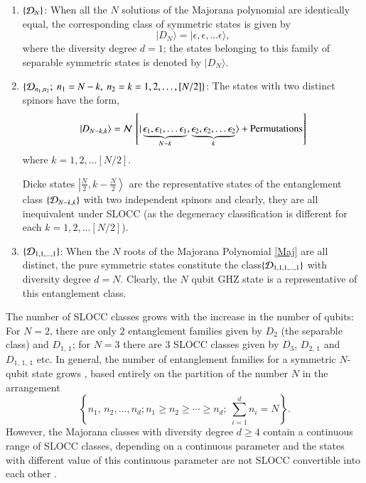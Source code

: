 \begin{enumerate}
\item $\{{\cal D}_N\}$: When all the $N$ solutions of the Majorana polynomial are identically equal, the corresponding class of  symmetric states is given by 
\begin{equation}
\vert D_N\rangle=\vert \epsilon,\epsilon,\ldots \epsilon\rangle,
\end{equation} 
where the diversity degree  $d=1$; the states belonging to this family of separable symmetric states  is denoted by $\vert D_N \rangle$.  

\item $\{{\cal D}_{n_1,n_2};\ n_1=N-k,\ n_2=k=1,2,\ldots, [N/2]\}$: The  states with two distinct spinors have the form, 
\begin{equation}
\vert D_{N-k,k}\rangle={\cal N}\,\left[\vert \underbrace{\epsilon_1, \epsilon_1,\ldots \epsilon_1}_{N-k}, \underbrace{\epsilon_2, \epsilon_2,\ldots \epsilon_2}_{k}\rangle+{\rm  Permutations}\right]\label{n1n2}
\end{equation} 
where $k=1,2, \ldots [N/2]$.  

Dicke states $\left\vert \frac{N}{2}, k-\frac{N}{2}\right\rangle$ are the representative states of the entanglement class $\{{\cal D}_{N-k,k}\}$ with two independent spinors  and clearly, they are all inequivalent under  SLOCC (as the degeneracy classification  is different for each $k=1,2, \ldots [N/2]$).

\item $\{{\cal D}_{1,1,\ldots, 1}\}$:  When the $N$ roots of the Majorana Polynomial \eqref{Maj} are all distinct, the pure symmetric states constitute  the class\break $\lbrace {\cal D}_{1,1,1,\ldots,1}\rbrace$ with diversity degree  $d=N$. Clearly, the $N$ qubit GHZ state is a representative of this entanglement class. 
\end{enumerate}
The number of SLOCC classes  grows  with the increase in the number of qubits: For $N=2$, there are only $2$ entanglement families given by 
$D_{2}$ (the separable class) and $D_{1,\,1}$; for $N=3$ there are $3$ SLOCC classes given by $D_{3}$, $D_{2,\,1}$ and $D_{1,\,1,\,1} $ etc.  In general, the number of entanglement families for a symmetric $N$-qubit state grows \cite{solano}, based entirely on the partition of the number $N$ in the arrangement 
$$\left\{n_1,\,n_2,\ldots ,n_d; n_1\geq n_2\geq\cdots\geq n_d;\   \sum_{i=1}^{d} n_i=N\right\}.$$ 
However, the Majorana classes  with diversity degree $d\geq 4$ contain a continuous range of SLOCC classes, depending on a continuous  parameter and the states with different value of this continuous  parameter  are not SLOCC convertible into each other \cite{solano}. 

